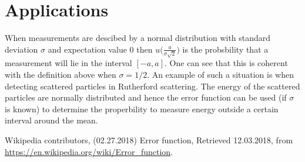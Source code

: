 \documentclass{report}
\begin{document}
\section*{Applications}
When measurements are descibed by a normal distribution with standard deviation $\sigma$ and expectation value 0 then $u\Big(\frac{a}{\sigma\sqrt{2}}\Big)$ is the probsbility that a measurement will lie in the interval $[-a, a]$\cite{wiki}. One can see that this is coherent with the definition above when $\sigma=1/2$. An example of such a situation is when detecting scattered particles in Rutherford scattering. The energy of the scattered particles are normally distributed and hence the error function can be used (if $\sigma$ is known) to determine the properbility to measure energy outside a certain interval around the mean. 

\bgroup
\let\clearpage\relax
\begin{thebibliography}{9}

Wikipedia contributors, 
(02.27.2018) Error function, Retrieved 12.03.2018, 
from \url{https://en.wikipedia.org/wiki/Error_function}.

\end{thebibliography}
\egroup
\end{document}

